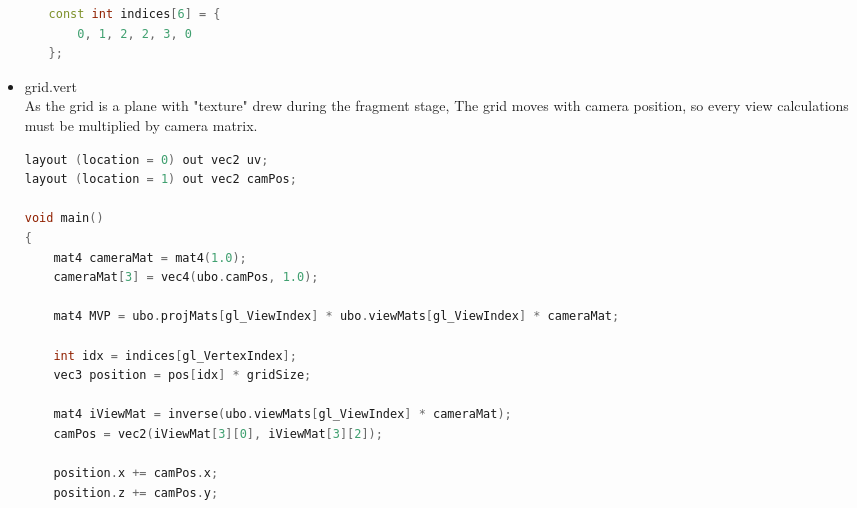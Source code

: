 \begin{itemize}
\begin{itemize}
\begin{lstlisting}[language=c++, caption=Grid shader parameters (./assets/shaders/grid\_params.h)]
const int indices[6] = {
    0, 1, 2, 2, 3, 0
};
\end{lstlisting}
    \end{itemize}
    \item grid.vert\\
    As the grid is a plane with "texture" drew during the fragment stage,
    The grid moves with camera position, so every view calculations must be multiplied by camera matrix.
\begin{lstlisting}[language=c++, caption=Grid vertex shader (./assets/shaders/grid.vert)]
layout (location = 0) out vec2 uv;
layout (location = 1) out vec2 camPos;

void main()
{
    mat4 cameraMat = mat4(1.0);
    cameraMat[3] = vec4(ubo.camPos, 1.0);

    mat4 MVP = ubo.projMats[gl_ViewIndex] * ubo.viewMats[gl_ViewIndex] * cameraMat;

    int idx = indices[gl_VertexIndex];
    vec3 position = pos[idx] * gridSize;

    mat4 iViewMat = inverse(ubo.viewMats[gl_ViewIndex] * cameraMat);
    camPos = vec2(iViewMat[3][0], iViewMat[3][2]);

    position.x += camPos.x;
    position.z += camPos.y;


\end{lstlisting}
\end{itemize}
